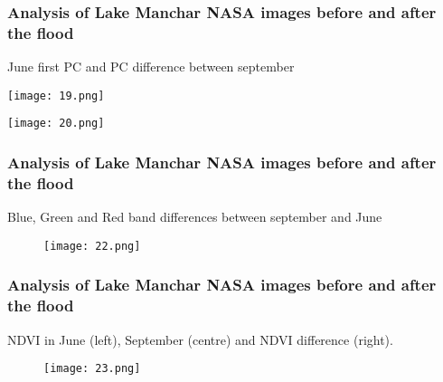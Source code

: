 \documentclass{beamer}
\begin{document}
\begin{frame}
  \frametitle{\small Analysis of Lake Manchar NASA images before and after the flood} 

  \centering\small June first PC and PC difference between september

   \begin{minipage}{0.48\textwidth}
    \centering
    \texttt{[image: 19.png]}
  \end{minipage}
  \hfill
  \begin{minipage}{0.48\textwidth}
    \centering
    \texttt{[image: 20.png]}
  \end{minipage}


\end{frame}

\begin{frame}
  \frametitle{\small Analysis of Lake Manchar NASA images before and after the flood} 

\centering  \small Blue, Green and Red band differences between september and June

  \begin{figure}
      \centering
      \texttt{[image: 22.png]}
      \label{fig:enter-label}
  \end{figure}

\end{frame}

\begin{frame}
  \frametitle{\small Analysis of Lake Manchar NASA images before and after the flood} 

    \centering\small NDVI in June (left), September (centre) and NDVI difference (right).

  \begin{figure}
      \centering
      \texttt{[image: 23.png]}
      \label{fig:enter-label}
  \end{figure}

\end{frame}

\end{document}
